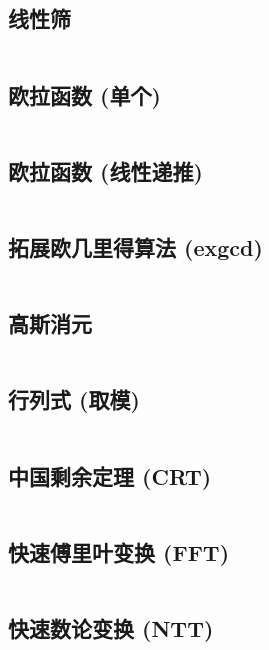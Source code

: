\documentclass[twoside,twocolumn]{article}
\begin{document}
\subsection{线性筛}
\inputminted[breaklines, frame=single]{c++}{../algo/数学/欧拉筛.cpp}


\subsection{欧拉函数 (单个)}
\inputminted[breaklines, frame=single]{c++}{../algo/数学/欧拉函数【O(sqrt n)单个】.cpp}

\subsection{欧拉函数 (线性递推)}
\inputminted[breaklines, frame=single]{c++}{../algo/数学/欧拉函数【O(n)预处理】.cpp}

\subsection{拓展欧几里得算法 (exgcd)}
\inputminted[breaklines, frame=single]{c++}{../algo/数学/exgcd.cpp}


\subsection{高斯消元}
\inputminted[breaklines, frame=single]{c++}{../algo/数学/高斯消元.cpp}



\subsection{行列式 (取模)}
\inputminted[breaklines, frame=single]{c++}{../algo/数学/行列式【取模】.cpp}


\subsection{中国剩余定理 (CRT)}
\inputminted[breaklines, frame=single]{c++}{../algo/数学/CRT.cpp}

\subsection{快速傅里叶变换 (FFT)}
\inputminted[breaklines, frame=single]{c++}{../algo/数学/FFT.cpp}

\subsection{快速数论变换 (NTT)}
\inputminted[breaklines, frame=single]{c++}{../algo/数学/NTT.cpp}
\end{document}
